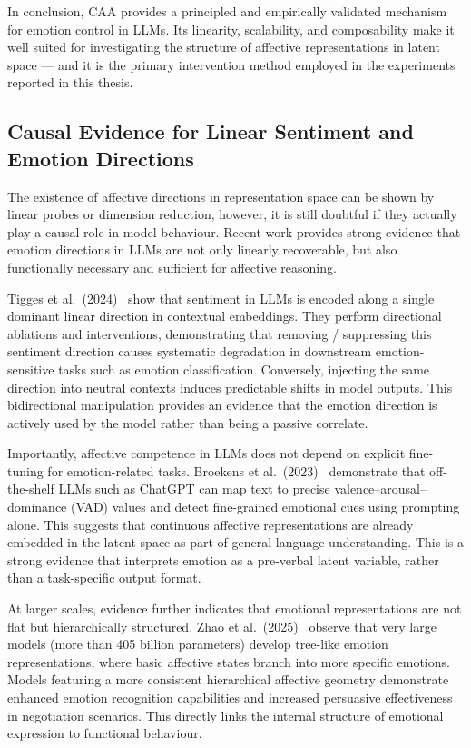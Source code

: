 In conclusion, CAA provides a principled and empirically validated mechanism for emotion control in LLMs. Its linearity, scalability, and composability make it well suited for investigating the structure of affective representations in latent space — and it is the primary intervention method employed in the experiments reported in this thesis.

\subsection{Causal Evidence for Linear Sentiment and Emotion Directions}

The existence of affective directions in representation space can be shown by linear probes or dimension reduction, however, it is still doubtful if they actually play a causal role in model behaviour. Recent work provides strong evidence that emotion directions in LLMs are not only linearly recoverable, but also functionally necessary and sufficient for affective reasoning.

Tigges et al.\ (2024)~\cite{hollinsworth-etal-2024-language} show that sentiment in LLMs is encoded along a single dominant linear direction in contextual embeddings. They perform directional ablations and interventions, demonstrating that removing / suppressing this sentiment direction causes systematic degradation in downstream emotion-sensitive tasks such as emotion classification. Conversely, injecting the same direction into neutral contexts induces predictable shifts in model outputs. This bidirectional manipulation provides an evidence that the emotion direction is actively used by the model rather than being a passive correlate.

Importantly, affective competence in LLMs does not depend on explicit fine-tuning for emotion-related tasks. Broekens et al.\ (2023)~\cite{broekens2023finegrainedaffectiveprocessingcapabilities} demonstrate that off-the-shelf LLMs such as ChatGPT can map text to precise valence--arousal--dominance (VAD) values and detect fine-grained emotional cues using prompting alone. This suggests that continuous affective representations are already embedded in the latent space as part of general language understanding. This is a strong evidence that interprets emotion as a pre-verbal latent variable, rather than a task-specific output format.

At larger scales, evidence further indicates that emotional representations are not flat but hierarchically structured. Zhao et al.\ (2025)~\cite{zhao2025emergencehierarchicalemotionorganization} observe that very large models (more than 405 billion parameters) develop tree-like emotion representations, where basic affective states branch into more specific emotions. Models featuring a more consistent hierarchical affective geometry demonstrate enhanced emotion recognition capabilities and increased persuasive effectiveness in negotiation scenarios. This directly links the internal structure of emotional expression to functional behaviour.

